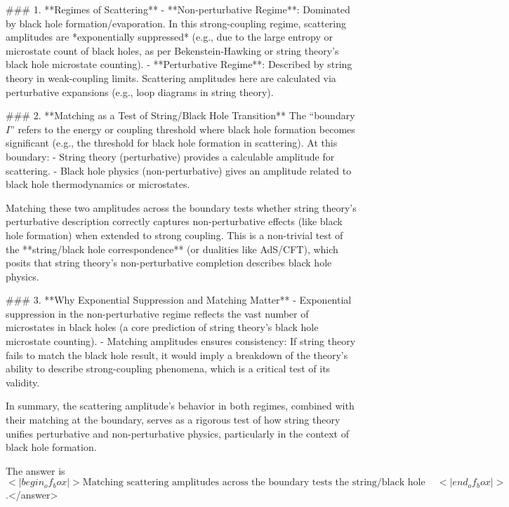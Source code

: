 ### 1. **Regimes of Scattering**  
- **Non-perturbative Regime**: Dominated by black hole formation/evaporation. In this strong-coupling regime, scattering amplitudes are *exponentially suppressed* (e.g., due to the large entropy or microstate count of black holes, as per Bekenstein-Hawking or string theory’s black hole microstate counting).  
- **Perturbative Regime**: Described by string theory in weak-coupling limits. Scattering amplitudes here are calculated via perturbative expansions (e.g., loop diagrams in string theory).    


### 2. **Matching as a Test of String/Black Hole Transition**  
The “boundary \( I \)” refers to the energy or coupling threshold where black hole formation becomes significant (e.g., the threshold for black hole formation in scattering). At this boundary:  
- String theory (perturbative) provides a calculable amplitude for scattering.  
- Black hole physics (non-perturbative) gives an amplitude related to black hole thermodynamics or microstates.  

Matching these two amplitudes across the boundary tests whether string theory’s perturbative description correctly captures non-perturbative effects (like black hole formation) when extended to strong coupling. This is a non-trivial test of the **string/black hole correspondence** (or dualities like AdS/CFT), which posits that string theory’s non-perturbative completion describes black hole physics.    


### 3. **Why Exponential Suppression and Matching Matter**  
- Exponential suppression in the non-perturbative regime reflects the vast number of microstates in black holes (a core prediction of string theory’s black hole microstate counting).  
- Matching amplitudes ensures consistency: If string theory fails to match the black hole result, it would imply a breakdown of the theory’s ability to describe strong-coupling phenomena, which is a critical test of its validity.    


In summary, the scattering amplitude’s behavior in both regimes, combined with their matching at the boundary, serves as a rigorous test of how string theory unifies perturbative and non-perturbative physics, particularly in the context of black hole formation.  

The answer is \(<|begin_of_box|>\text{Matching scattering amplitudes across the boundary tests the string/black hole transition, ensuring consistency between perturbative string theory and non-perturbative black hole physics.}<|end_of_box|>\).</answer>